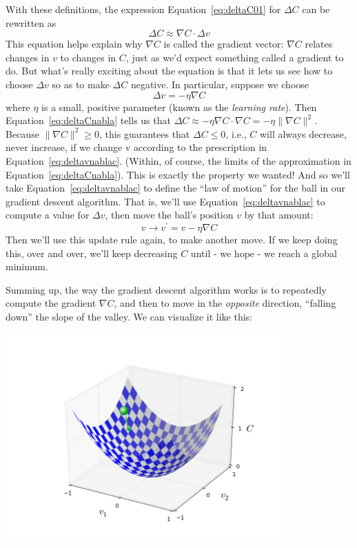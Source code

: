 With these definitions, the expression Equation~\ref{eq:deltaC01} for $\Delta C$ can be rewritten as 
\begin{equation}
\Delta C \approx \nabla C \cdot \Delta v
\label{eq:deltaCnabla}
\end{equation}
This equation helps explain why $\nabla C$ is called the gradient vector: $\nabla C$ relates changes in $v$ to changes in $C$, just as we'd expect something called a gradient to do. But what's really exciting about the equation is that it lets us see how to choose $\Delta v$ so as to make $\Delta C$ negative. In particular, suppose we choose 
\begin{equation}
\Delta v=-\eta \nabla C
\label{eq:deltavnablac}
\end{equation}
where $\eta$ is a small, positive parameter (known as the \textit{learning rate}). Then Equation~\ref{eq:deltaCnabla} tells us that $\Delta C \approx-\eta \nabla C \cdot \nabla C=-\eta\parallel\nabla C\parallel^{2}$. Because $\parallel\nabla C\parallel^{2} \geq 0$, this guarantees that $\Delta C\leq 0$, i.e., $C$ will always decrease, never increase, if we change v according to the prescription in Equation~\ref{eq:deltavnablac}. (Within, of course, the limits of the approximation in Equation~\ref{eq:deltaCnabla}). This is exactly the property we wanted! And so we'll take Equation~\ref{eq:deltavnablac} to define the ``law of motion'' for the ball in our gradient descent algorithm. That is, we'll use Equation~\ref{eq:deltavnablac} to compute a value for $\Delta v$, then move the ball's position $v$ by that amount: 
\begin{equation}
v \rightarrow v^{\prime}=v-\eta \nabla C
\end{equation}
Then we'll use this update rule again, to make another move. If we keep doing this, over and over, we'll keep decreasing $C$ until - we hope - we reach a global minimum.

Summing up, the way the gradient descent algorithm works is to repeatedly compute the gradient $\nabla C$, and then to move in the \textit{opposite} direction, ``falling down'' the slope of the valley. We can visualize it like this:

{\centering
\includegraphics[width=0.8\textwidth,]{pic/valley_with_ball}
\par}


